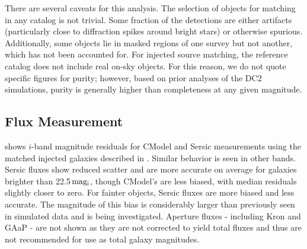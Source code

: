 There are several caveats for this analysis. The selection of objects for matching in any catalog is not trivial. Some fraction of the detections are either artifacts (particularly close to diffraction spikes around bright stars) or otherwise spurious. Additionally, some objects lie in masked regions of one survey but not another, which has not been accounted for. For injected source matching, the reference catalog does not include real on-sky objects. For this reason, we do not quote specific figures for purity; however, based on prior analyses of the \gls{DC2} simulations, purity is generally higher than completeness at any given magnitude.

\subsection{Flux Measurement}
\label{ssec:fluxes}

 shows $i$-band magnitude residuals for CModel and Sersic measurements using the matched injected galaxies described in .
Similar behavior is seen in other bands.
Sersic fluxes show reduced scatter and are more accurate on average for galaxies brighter than 22.5\,${\rm mag_{i}}$, though CModel's are less biased, with median residuals  slightly closer to zero.
For fainter objects, Sersic fluxes are more biased and less accurate.
The magnitude of this bias is considerably larger than previously seen in simulated data and is being investigated.
Aperture fluxes - including Kron and \gls{GAaP} - are not shown as they are not corrected to yield total fluxes and thus are not recommended for use as total galaxy magnitudes.

